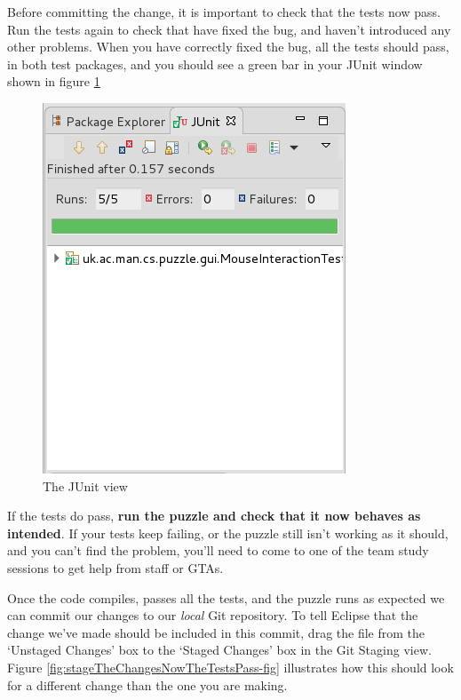 \documentclass[
]{book}
\begin{document}
Before committing the change, it is important to check that the tests now pass. Run the tests again to check that have fixed the bug, and haven't introduced any other problems. When you have correctly fixed the bug, all the tests should pass, in both test packages, and you should see a green bar in your JUnit window shown in figure \ref{fig:runTestsAfterMakingTheChangeAndAllPass-fig}

\begin{figure}

{\centering \includegraphics[width=0.5\linewidth]{images/runTestsAfterMakingTheChangeAndAllPass} 

}

\caption{The JUnit view}\label{fig:runTestsAfterMakingTheChangeAndAllPass-fig}
\end{figure}

If the tests do pass, \textbf{run the puzzle and check that it now behaves as intended}. If your tests keep failing, or the puzzle still isn't working as it should, and you can't find the problem, you'll need to come to one of the team study sessions to get help from staff or GTAs.

Once the code compiles, passes all the tests, and the puzzle runs as expected we can commit our changes to our \emph{local} Git repository. To tell Eclipse that the change we've made should be included in this commit, drag the file from the `Unstaged Changes' box to the `Staged Changes' box in the Git Staging view. Figure \ref{fig:stageTheChangesNowTheTestsPass-fig} illustrates how this should look for a different change than the one you are making.
\end{document}

